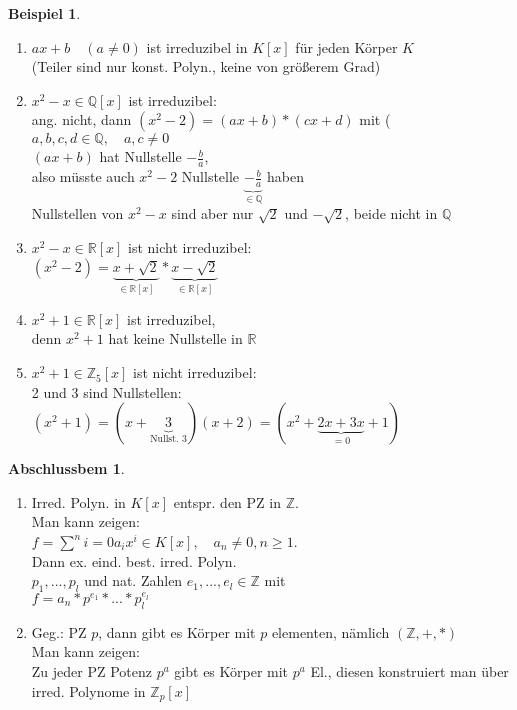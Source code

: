 \documentclass[a4paper,11pt]{article}
\newtheorem{bsp}[definition]{Beispiel}
\newtheorem{abem}[definition]{Abschlussbem}
\begin{document}
\begin{bsp}
\end{bsp}
\begin{enumerate}[label=\alph*)]
	\item $ax+b\quad (a\neq0)$ ist irreduzibel in $K[x]$ für jeden Körper $K$ \\
	(Teiler sind nur konst. Polyn., keine von größerem Grad)
	\item $x^2-x\in\mathbb{Q}[x]$ ist irreduzibel: \\
	ang. nicht, dann $(x^2-2)=(ax+b)*(cx+d)$ mit ($a,b,c,d\in\mathbb{Q},\quad a,c\neq0$ \\
	$(ax+b)$ hat Nullstelle $-\frac{b}{a}$, \\
	also müsste auch $x^2-2$ Nullstelle $\underbrace{-\frac{b}{a}}_{\in\mathbb{Q}}$ haben \\
	Nullstellen von $x^2-x$ sind aber nur $\sqrt{2}$ und $-\sqrt{2}$, beide nicht in $\mathbb{Q}$
	\item $x^2-x\in\mathbb{R}[x]$ ist nicht irreduzibel: \\
	$(x^2-2)=\underbrace{x+\sqrt{2}}_{\in\mathbb{R}[x]}*\underbrace{x-\sqrt{2}}_{\in\mathbb{R}[x]}$
	\item $x^2+1\in\mathbb{R}[x]$ ist irreduzibel, \\denn $x^2+1$ hat keine Nullstelle in $\mathbb{R}$
	\item $x^2+1\in\mathbb{Z}_5[x]$ ist nicht irreduzibel: \\
	2 und 3 sind Nullstellen: \\
	$(x^2+1)=(x+\underbrace{3}_{\text{Nullst. 3}})(x+2)=(x^2+\underbrace{2x+3x}_{=0}+1)$
\end{enumerate}

\begin{abem}
\end{abem}
\begin{enumerate}[label=\alph*)]
	\item Irred. Polyn. in $K[x]$ entspr. den PZ in $\mathbb{Z}$. \\
	Man kann zeigen: \\
	$f=\sum^n{i=0}a_ix^i\in K[x],\quad a_n\neq0,n\geq1$. \\
	Dann ex. eind. best. irred. Polyn. \\
	$p_1,...,p_l$ und nat. Zahlen $e_1,...,e_l\in\mathbb{Z}$ mit \\
	$f=a_n*p^{e_1}*...*p_l^{e_l}$
	\item Geg.: PZ $p$, dann gibt es Körper mit $p$ elementen, nämlich $(\mathbb{Z},+,*)$ \\
	Man kann zeigen: \\
	Zu jeder PZ Potenz $p^a$ gibt es Körper mit $p^a$ El., diesen konstruiert man über irred. Polynome in $\mathbb{Z}_p[x]$
\end{enumerate}
\end{document}
